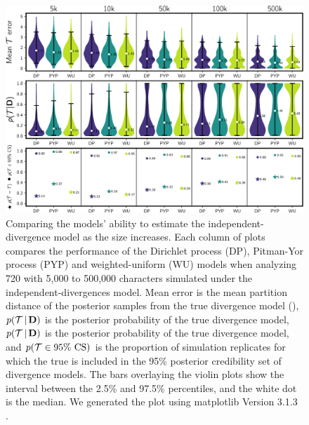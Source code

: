 \documentclass[letterpaper,12pt]{article}
\begin{document}
\begin{figure}[htbp]
    \begin{center}
        \includegraphics[width=\textwidth,height=\textheight,keepaspectratio]{../images/from-project-repo/nchars-model-performance-violin-cropped.pdf}
        \captionsetup{listformat=figList}
        \caption{
        Comparing the models' ability to estimate the independent-divergence
        model as the \dataset size increases.
        Each column of plots compares the performance of the Dirichlet process
        (DP), Pitman-Yor process (PYP) and weighted-uniform (WU) models when
        analyzing 720 \datasets with 5,000 to 500,000 characters simulated
        under the independent-divergences model.
        Mean \etimesets error is the mean partition distance
        of the posterior samples from the true
        divergence model (\etimesets),
        $p(\mathcal{T} \,|\, \mathbf{D})$ is the posterior probability
        of the true divergence model,
        $p(\mathcal{T} \,|\, \mathbf{D})$ is the posterior probability of the
        true divergence model,
        and
        $p(\mathcal{T} \in \textrm{95\% CS})$ is the proportion of simulation
        replicates for which the true \etimesets is included in the 95\%
        posterior credibility set of divergence models.
        The bars overlaying the violin plots show the interval between the
        2.5\% and 97.5\% percentiles, and the white dot is the median.
        We generated the plot using matplotlib Version 3.1.3
        \citep{matplotlib}.
        }
        \label{fig:modelperformancebysize}
    \end{center}
\end{figure}
\end{document}

